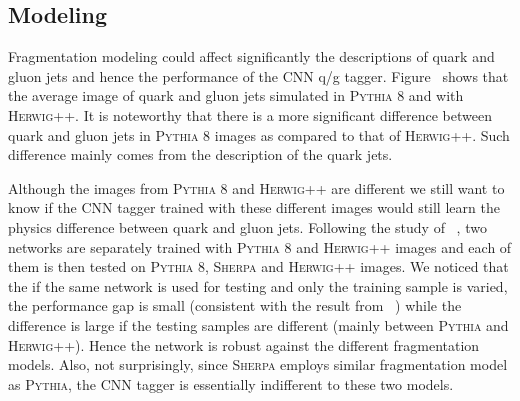 \subsection{Modeling}

Fragmentation modeling could affect significantly the descriptions of quark and gluon jets and hence
the performance of the CNN q/g tagger.
Figure~\label{fig:cnn-avg:CNN} shows that the average image of quark and gluon jets simulated in 
\textsc{Pythia} 8 and with \textsc{Herwig++}. It is noteworthy that there is a more significant difference between
quark and gluon jets in \textsc{Pythia} 8 images as compared to that of \textsc{Herwig++}. Such difference mainly comes
from the description of the quark jets. 


Although the images from \textsc{Pythia} 8 and \textsc{Herwig++} are different
we still want to know if the CNN tagger trained with these different images
would still learn the physics difference between quark and gluon jets. Following the study
of ~\cite{Barnard:2016qma}, two networks are separately trained with \textsc{Pythia} 8 and \textsc{Herwig++}
images and each of them is then tested on \textsc{Pythia} 8, \textsc{Sherpa} and \textsc{Herwig++}
images. We noticed that the if the same network is used for testing and only the training sample is varied, 
the performance gap is small (consistent with the result from ~\cite{Komiske:2016rsd}) while the difference is large
if the testing samples are different (mainly between \textsc{Pythia} and \textsc{Herwig++}).
Hence the network is robust against the different fragmentation models. Also, not surprisingly, since \textsc{Sherpa} employs similar fragmentation
model as \textsc{Pythia}, the CNN tagger is essentially indifferent to these two models.

